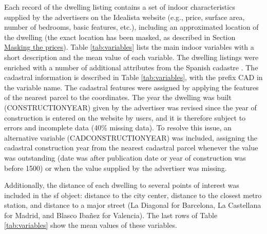 \documentclass[Royal,times,sageh]{sagej}
\begin{document}
Each record of the dwelling listing contains a set of indoor
characteristics supplied by the advertisers on the Idealista website
(e.g., price, surface area, number of bedrooms, basic features, etc.),
including an approximated location of the dwelling (the exact location
has been masked, as described in Section
\protect\hyperlink{anonymizing}{Masking the prices}). Table
\ref{tab:variables} lists the main indoor variables with a short
description and the mean value of each variable. The dwelling listings
were enriched with a number of additional attributes from the Spanish
cadastre \citep{Catastro}. The cadastral information is described in
Table \ref{tab:variables}, with the prefix CAD in the variable name. The
cadastral features were assigned by applying the features of the nearest
parcel to the coordinates. The year the dwelling was built
(CONSTRUCTIONYEAR) given by the advertiser was revised since the year of
construction is entered on the website by users, and it is therefore
subject to errors and incomplete data (40\% missing data). To resolve
this issue, an alternative variable (CADCONSTRUCTIONYEAR) was included,
assigning the cadastral construction year from the nearest cadastral
parcel whenever the value was outstanding (date was after publication
date or year of construction was before 1500) or when the value supplied
by the advertiser was missing.

Additionally, the distance of each dwelling to several points of
interest was included in the sf object: distance to the city center,
distance to the closest metro station, and distance to a major street
(La Diagonal for Barcelona, La Castellana for Madrid, and Blasco Ibañez
for Valencia). The last rows of Table \ref{tab:variables} show the mean
values of these variables.
\end{document}
